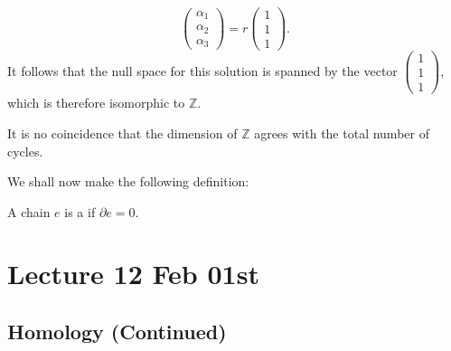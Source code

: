 \documentclass[notoc,notitlepage]{tufte-book}
\begin{document}
\begin{eg}
  \begin{equation*}
    \begin{pmatrix}
      \alpha_1 \\ \alpha_2 \\ \alpha_3
    \end{pmatrix} = 
    r \begin{pmatrix}
      1 \\ 1 \\ 1
    \end{pmatrix}.
  \end{equation*}
  It follows that the null space for this solution is spanned by the vector
  $\left( \begin{smallmatrix} 1 \\ 1 \\ 1 \end{smallmatrix} \right)$, which is
  therefore isomorphic to $\mathbb{Z}$.
\end{eg}

\begin{remark}
  It is no coincidence that the dimension of $\mathbb{Z}$ agrees with the total
  number of cycles.
\end{remark}

We shall now make the following definition:

\begin{defn}[Cycle]\label{defn:cycle}
  A chain $e$ is a  if $\partial e = 0$.
\end{defn}



\chapter{Lecture 12 Feb 01st}%
\label{chp:lecture_12_feb_01st}

\section{Homology (Continued)}%
\label{sec:homology_continued}
\end{document}
